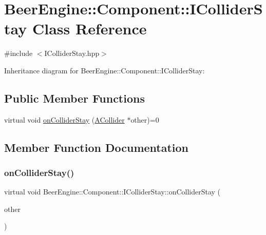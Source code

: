 \hypertarget{class_beer_engine_1_1_component_1_1_i_collider_stay}{}\section{Beer\+Engine\+:\+:Component\+:\+:I\+Collider\+Stay Class Reference}
\label{class_beer_engine_1_1_component_1_1_i_collider_stay}


{\ttfamily \#include $<$I\+Collider\+Stay.\+hpp$>$}



Inheritance diagram for Beer\+Engine\+:\+:Component\+:\+:I\+Collider\+Stay\+:
\subsection*{Public Member Functions}
\begin{DoxyCompactItemize}
\item 
virtual void \mbox{\hyperlink{class_beer_engine_1_1_component_1_1_i_collider_stay_a462a0eb147235000265ed3f29d8b343e}{on\+Collider\+Stay}} (\mbox{\hyperlink{class_beer_engine_1_1_component_1_1_a_collider}{A\+Collider}} $\ast$other)=0
\end{DoxyCompactItemize}


\subsection{Member Function Documentation}
\mbox{\label{class_beer_engine_1_1_component_1_1_i_collider_stay_a462a0eb147235000265ed3f29d8b343e}} 
\subsubsection{\texorpdfstring{on\+Collider\+Stay()}{onColliderStay()}}
{\footnotesize\ttfamily virtual void Beer\+Engine\+::\+Component\+::\+I\+Collider\+Stay\+::on\+Collider\+Stay (\begin{DoxyParamCaption}\item[{\mbox{\hyperlink{class_beer_engine_1_1_component_1_1_a_collider}{A\+Collider}} $\ast$}]{other }\end{DoxyParamCaption})\hspace{0.3cm}{\ttfamily [pure virtual]}}



